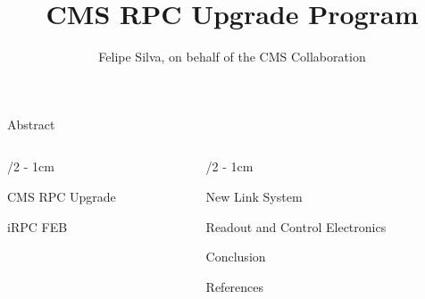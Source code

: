 \documentclass[portrait]{uioposter}
\title{CMS RPC Upgrade Program}
\author
{%
    Felipe Silva, on behalf of the CMS Collaboration
}
\institute
{
   Rio de Janeiro State University - Email: felipe.silva@cern.ch
}
\begin{document}
\begin{frame}


    \begin{block}{Abstract}
        \vskip-1.5cm
        
    \end{block}

\begin{columns}[onlytextwidth]

\begin{column}{\textwidth/2 - 1cm}

    \vskip-2cm
    \begin{block}{CMS RPC Upgrade}
        \vskip-1.5cm
        
    \end{block}


    \vskip-2cm
    \begin{block}{iRPC FEB}
        \vskip-1.5cm
        
    \end{block}
    
\end{column}


\begin{column}{\textwidth/2 - 1cm}

    \vskip-2cm
    \begin{block}{New Link System}
        \vskip-1.5cm
        
    \end{block}

    \vskip-2cm
    \begin{block}{Readout and Control Electronics}
        \vskip-1.5cm
        
    \end{block}


    \vskip-2cm
    \begin{block}{Conclusion}
        
    \end{block}

    \vskip-2cm
    \begin{block}{References}
        \printbibliography
    \end{block}


\end{column}



\end{columns}
\end{frame}
\end{document}

